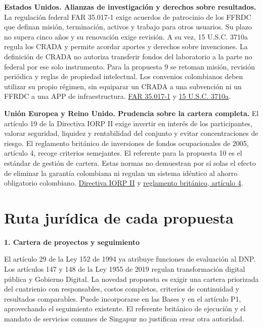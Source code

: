 \textbf{Estados Unidos. Alianzas de investigación y derechos sobre resultados.} La regulación federal FAR 35.017-1 exige acuerdos de patrocinio de los FFRDC que definan misión, terminación, activos y trabajo para otros usuarios. Su plazo no supera cinco años y su renovación exige revisión. A su vez, 15 U.S.C. 3710a regula los CRADA y permite acordar aportes y derechos sobre invenciones. La definición de CRADA no autoriza transferir fondos del laboratorio a la parte no federal por ese solo instrumento. Para la propuesta 9 se retoman misión, revisión periódica y reglas de propiedad intelectual. Los convenios colombianos deben utilizar su propio régimen, sin equiparar un CRADA a una subvención ni un FFRDC a una APP de infraestructura. \href{https://www.acquisition.gov/far/35.017-1}{FAR 35.017-1} y \href{https://uscode.house.gov/view.xhtml?req=granuleid:USC-prelim-title15-section3710a\&num=0\&edition=prelim}{15 U.S.C. 3710a}.

\textbf{Unión Europea y Reino Unido. Prudencia sobre la cartera completa.} El artículo 19 de la Directiva IORP II exige invertir en interés de los participantes, valorar seguridad, liquidez y rentabilidad del conjunto y evitar concentraciones de riesgo. El reglamento británico de inversiones de fondos ocupacionales de 2005, artículo 4, recoge criterios semejantes. El referente para la propuesta 10 es el estándar de gestión de cartera. Estas normas no demuestran por sí solas el efecto de eliminar la garantía colombiana ni regulan un sistema idéntico al ahorro obligatorio colombiano. \href{https://eur-lex.europa.eu/legal-content/ES/TXT/?uri=CELEX:32016L2341}{Directiva IORP II} y \href{https://www.legislation.gov.uk/uksi/2005/3378/regulation/4/data.html}{reglamento británico, artículo 4}.

\section*{Ruta jurídica de cada propuesta}

\textbf{1. Cartera de proyectos y seguimiento}\par\nobreak

El artículo 29 de la Ley 152 de 1994 ya atribuye funciones de evaluación al DNP. Los artículos 147 y 148 de la Ley 1955 de 2019 regulan transformación digital pública y Gobierno Digital. La novedad propuesta es exigir una cartera priorizada del cuatrienio con responsables, costos completos, criterios de continuidad y resultados comparables. Puede incorporarse en las Bases y en el artículo P1, aprovechando el seguimiento existente. El referente británico de ejecución y el mandato de servicios comunes de Singapur no justifican crear otra autoridad.

